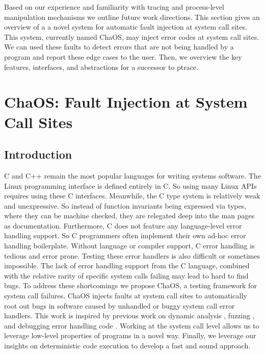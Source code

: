 \newcommand{\ldpreload}{LD\textunderscore PRELOAD}

Based on our experience and familiarity with tracing and process-level manipulation mechanisms we outline future work directions. This section gives an overview of a a novel system for automatic fault injection at system call sites. This system, currently named ChaOS, may inject error codes at system call sites. We can used these faults to detect errors that are not being handled by a program and report these edge cases to the user. Then, we overview the key features, interfaces, and abstractions for a successor to ptrace.

\section{ChaOS: Fault Injection at System Call Sites}

\subsection{Introduction}
C and C++ remain the most popular languages for writing systems software. The Linux programming interface is defined entirely in C. So using many Linux APIs requires using these C interfaces. Meanwhile, the C type system is relatively weak and unexpressive. So instead of function invariants being expressed via types, where they can be machine checked, they are relegated deep into the man pages as documentation. Furthermore, C does not feature any language-level error handling support. So C programmers often implement their own ad-hoc error handling boilerplate. Without language or compiler support, C error handling is tedious and error prone. Testing these error handlers is also difficult or sometimes impossible. The lack of error handling support from the C language, combined with the relative rarity of specific system calls failing may lead to hard to find bugs.
To address these shortcomings we propose ChaOS, a testing framework for system call failures. ChaOS injects faults at system call sites to automatically root out bugs in software caused by unhandled or buggy system call error handlers. This work is inspired by previous work on dynamic analysis \cite{coz}, fuzzing \cite{afl, fuzz-scheduler}, and debugging error handling code \cite{fuzzing-error-handling}.
Working at the system call level allows us to leverage low-level properties of programs in a novel way. Finally, we leverage our insights on deterministic code execution to develop a fast and sound approach.

